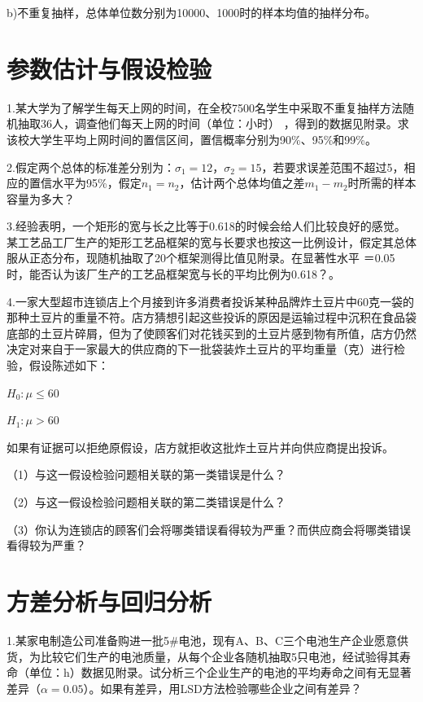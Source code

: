 \documentclass[]{ctexbook}
\begin{document}
b)不重复抽样，总体单位数分别为10000、1000时的样本均值的抽样分布。

\hypertarget{ux53c2ux6570ux4f30ux8ba1ux4e0eux5047ux8bbeux68c0ux9a8c}{%
\section{参数估计与假设检验}\label{ux53c2ux6570ux4f30ux8ba1ux4e0eux5047ux8bbeux68c0ux9a8c}}

1.某大学为了解学生每天上网的时间，在全校7500名学生中采取不重复抽样方法随机抽取36人，调查他们每天上网的时间（单位：小时） ，得到的数据见附录。求该校大学生平均上网时间的置信区间，置信概率分别为90\%、95\%和99\%。

2.假定两个总体的标准差分别为：\(\sigma_1=12\)，\(\sigma_2=15\)，若要求误差范围不超过5，相应的置信水平为95\%，假定\(n_1=n_2\)，估计两个总体均值之差\(m_1-m_2\)时所需的样本容量为多大？

3.经验表明，一个矩形的宽与长之比等于0.618的时候会给人们比较良好的感觉。某工艺品工厂生产的矩形工艺品框架的宽与长要求也按这一比例设计，假定其总体服从正态分布，现随机抽取了20个框架测得比值见附录。在显著性水平 ＝0.05时，能否认为该厂生产的工艺品框架宽与长的平均比例为0.618？。

4.一家大型超市连锁店上个月接到许多消费者投诉某种品牌炸土豆片中60克一袋的那种土豆片的重量不符。店方猜想引起这些投诉的原因是运输过程中沉积在食品袋底部的土豆片碎屑，但为了使顾客们对花钱买到的土豆片感到物有所值，店方仍然决定对来自于一家最大的供应商的下一批袋装炸土豆片的平均重量（克）进行检验，假设陈述如下：

\(H_0:\mu\le 60\)

\(H_1:\mu>60\)

如果有证据可以拒绝原假设，店方就拒收这批炸土豆片并向供应商提出投诉。

（1）与这一假设检验问题相关联的第一类错误是什么？

（2）与这一假设检验问题相关联的第二类错误是什么？

（3）你认为连锁店的顾客们会将哪类错误看得较为严重？而供应商会将哪类错误看得较为严重？

\hypertarget{ux65b9ux5deeux5206ux6790ux4e0eux56deux5f52ux5206ux6790}{%
\section{方差分析与回归分析}\label{ux65b9ux5deeux5206ux6790ux4e0eux56deux5f52ux5206ux6790}}

1.某家电制造公司准备购进一批5\#电池，现有A、B、C三个电池生产企业愿意供货，为比较它们生产的电池质量，从每个企业各随机抽取5只电池，经试验得其寿命（单位：h）数据见附录。试分析三个企业生产的电池的平均寿命之间有无显著差异（\(\alpha=0.05\)）。如果有差异，用LSD方法检验哪些企业之间有差异？
\end{document}
